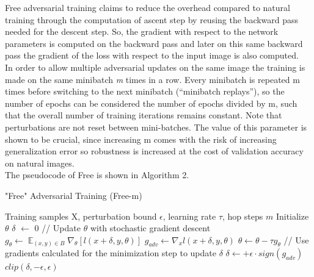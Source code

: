 \documentclass{article}
\DeclareMathOperator{\EX}{\mathbb{E}}%
\begin{document}
Free adversarial training \cite{ShafahiEtAl2019b} claims to reduce the overhead compared to natural training through the computation of ascent step by reusing the backward pass needed for the descent step. So, the gradient with respect to the network parameters is computed on the backward pass and later on this same backward pass the gradient of the loss with respect to the input image is also computed.\\
In order to allow multiple adversarial updates on the same image the training is made on the same minibatch \textit{m} times in a row. Every minibatch is repeated m times before switching to the next minibatch (“minibatch replays”), so the number of epochs can be considered the number of epochs divided by m, such that the overall number of training iterations remains constant. Note that perturbations are not reset between mini-batches. The value of this parameter is shown to be crucial, since increasing m comes with the risk of increasing generalization error so robustness is increased at the cost of validation accuracy on natural images.\\
The pseudocode of Free is shown in Algorithm 2.

\begin{algorithm}[H]
	\caption{"Free" Adversarial Training (Free-m)}
	\begin{algorithmic}[1]
		\Require Training samples X, perturbation bound $\epsilon$, learning rate $\tau$, hop steps $m$
		\State Initialize $\theta$
		\State $\delta$ $\leftarrow$ 0
		\State // Update $\theta$ with stochastic gradient descent
		\State $g_{\theta} \leftarrow \EX_{(x,y) \in B} \nabla_{\theta} [l(x+\delta, y, \theta)]$
		\State $g_{adv} \leftarrow \nabla_{x} l(x+\delta, y, \theta)$
		\State $\theta \leftarrow \theta - \tau g_{\theta}$
		\State // Use gradients calculated for the minimization step to update $\delta$
		\State $\delta \leftarrow + \epsilon \cdot sign(g_{adv})$
		\State $clip(\delta, -\epsilon, \epsilon)$
		\EndFor
		\EndFor
		\EndFor
	\end{algorithmic}
\end{algorithm}
\end{document}
